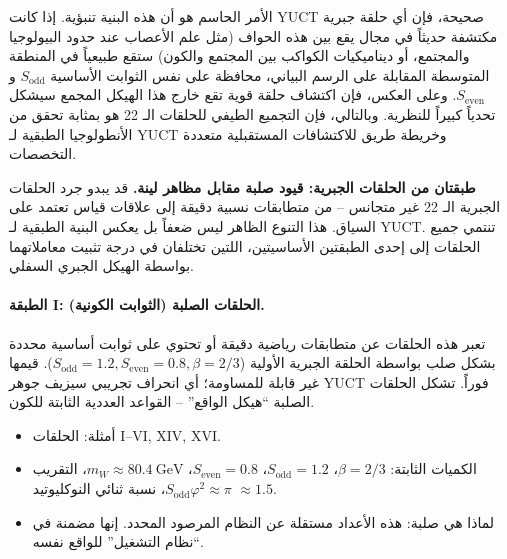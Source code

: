 \documentclass[12pt,a4paper]{article}
\begin{document}
	الأمر الحاسم هو أن هذه البنية تنبؤية. إذا كانت YUCT صحيحة، فإن أي حلقة جبرية مكتشفة حديثاً في مجال يقع بين هذه الحواف (مثل علم الأعصاب عند حدود البيولوجيا والمجتمع، أو ديناميكيات الكواكب بين المجتمع والكون) ستقع طبيعياً في المنطقة المتوسطة المقابلة على الرسم البياني، محافظة على نفس الثوابت الأساسية \(S_{\mathrm{odd}}\) و \(S_{\mathrm{even}}\). وعلى العكس، فإن اكتشاف حلقة قوية تقع خارج هذا الهيكل المجمع سيشكل تحدياً كبيراً للنظرية. وبالتالي، فإن التجميع الطيفي للحلقات الـ 22 هو بمثابة تحقق من الأنطولوجيا الطبقية لـ YUCT وخريطة طريق للاكتشافات المستقبلية متعددة التخصصات.
	
	\vspace{0.5cm}
	\noindent
	\textbf{طبقتان من الحلقات الجبرية: قيود صلبة مقابل مظاهر لينة.}
	قد يبدو جرد الحلقات الجبرية الـ 22 غير متجانس – من متطابقات نسبية دقيقة إلى علاقات قياس تعتمد على السياق. هذا التنوع الظاهر ليس ضعفاً بل يعكس البنية الطبقية لـ YUCT. تنتمي جميع الحلقات إلى إحدى الطبقتين الأساسيتين، اللتين تختلفان في درجة تثبيت معاملاتهما بواسطة الهيكل الجبري السفلي.
	
	\paragraph{الطبقة I: الحلقات الصلبة (الثوابت الكونية).}
	تعبر هذه الحلقات عن متطابقات رياضية دقيقة أو تحتوي على ثوابت أساسية محددة بشكل صلب بواسطة الحلقة الجبرية الأولية (\(S_{\mathrm{odd}}=1.2, S_{\mathrm{even}}=0.8, \beta=2/3\)). قيمها غير قابلة للمساومة؛ أي انحراف تجريبي سيزيف جوهر YUCT فوراً. تشكل الحلقات الصلبة ``هيكل الواقع'' – القواعد العددية الثابتة للكون.
	\begin{itemize}
		\item أمثلة: الحلقات I--VI, XIV, XVI.
		\item الكميات الثابتة: \(\beta = 2/3\)، \(S_{\mathrm{odd}}=1.2\)، \(S_{\mathrm{even}}=0.8\)، \(m_W \approx 80.4\ \text{GeV}\)، التقريب \(S_{\mathrm{odd}}\varphi^2 \approx \pi\)، نسبة ثنائي النوكليوتيد \(\approx 1.5\).
		\item لماذا هي صلبة: هذه الأعداد مستقلة عن النظام المرصود المحدد. إنها مضمنة في ``نظام التشغيل'' للواقع نفسه.
	\end{itemize}
	
\end{document}
